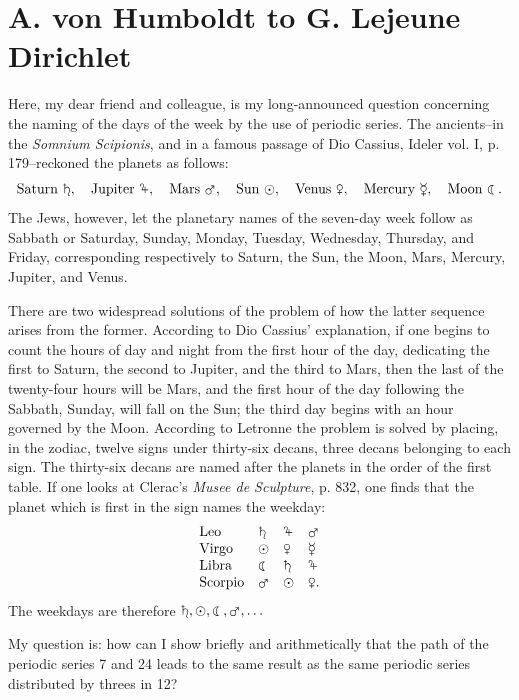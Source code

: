 \documentclass[11pt]{article}
\begin{document}
\section*{A. von Humboldt to G. Lejeune Dirichlet}
Here, my dear friend and colleague, is my long-announced question concerning the naming of the days of the week by the use of periodic series. The ancients--in the \emph{Somnium Scipionis}, and in a famous passage of Dio Cassius, Ideler vol. I, p. 179--reckoned the planets as follows:
\[
\text{Saturn }\saturn,
\quad \text{Jupiter }\jupiter,
\quad \text{Mars }\mars,
\quad \text{Sun }\astrosun,
\quad \text{Venus }\venus,
\quad \text{Mercury }\mercury,
\quad \text{Moon }\leftmoon .
\]
The Jews, however, let the planetary names of the seven-day week follow as Sabbath or Saturday, Sunday, Monday, Tuesday, Wednesday, Thursday, and Friday, corresponding respectively to Saturn, the Sun, the Moon, Mars, Mercury, Jupiter, and Venus.

There are two widespread solutions of the problem of how the latter sequence arises from the former. According to Dio Cassius' explanation, if one begins to count the hours of day and night from the first hour of the day, dedicating the first to Saturn, the second to Jupiter, and the third to Mars, then the last of the twenty-four hours will be Mars, and the first hour of the day following the Sabbath, Sunday, will fall on the Sun; the third day begins with an hour governed by the Moon. According to Letronne the problem is solved by placing, in the zodiac, twelve signs under thirty-six decans, three decans belonging to each sign. The thirty-six decans are named after the planets in the order of the first table. If one looks at Clerac's \emph{Musee de Sculpture}, p. 832, one finds that the planet which is first in the sign names the weekday:
\[
\begin{array}{llll}
\text{Leo} & \saturn & \jupiter & \mars\\
\text{Virgo} & \astrosun & \venus & \mercury\\
\text{Libra} & \leftmoon & \saturn & \jupiter\\
\text{Scorpio} & \mars & \astrosun & \venus.
\end{array}
\]
The weekdays are therefore \(\saturn,\astrosun,\leftmoon,\mars,\ldots\)

My question is: how can I show briefly and arithmetically that the path of the periodic series 7 and 24 leads to the same result as the same periodic series distributed by threes in 12?
\end{document}
